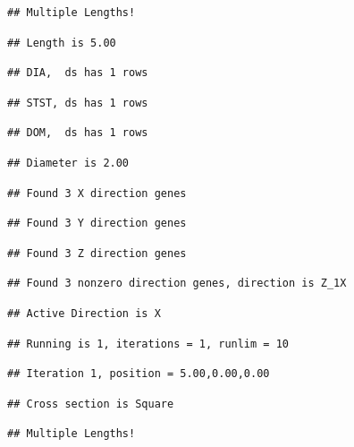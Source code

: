\documentclass[]{article}
\begin{document}
\begin{verbatim}
## Multiple Lengths!
\end{verbatim}

\begin{verbatim}
## Length is 5.00
\end{verbatim}

\begin{verbatim}
## DIA,  ds has 1 rows
\end{verbatim}

\begin{verbatim}
## STST, ds has 1 rows
\end{verbatim}

\begin{verbatim}
## DOM,  ds has 1 rows
\end{verbatim}

\begin{verbatim}
## Diameter is 2.00
\end{verbatim}

\begin{verbatim}
## Found 3 X direction genes
\end{verbatim}

\begin{verbatim}
## Found 3 Y direction genes
\end{verbatim}

\begin{verbatim}
## Found 3 Z direction genes
\end{verbatim}

\begin{verbatim}
## Found 3 nonzero direction genes, direction is Z_1X
\end{verbatim}

\begin{verbatim}
## Active Direction is X
\end{verbatim}

\begin{verbatim}
## Running is 1, iterations = 1, runlim = 10
\end{verbatim}

\begin{verbatim}
## Iteration 1, position = 5.00,0.00,0.00
\end{verbatim}

\begin{verbatim}
## Cross section is Square
\end{verbatim}

\begin{verbatim}
## Multiple Lengths!
\end{verbatim}
\end{document}
